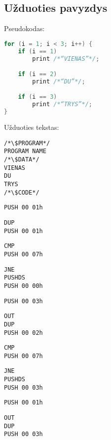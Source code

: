 \documentclass{scrartcl}
\begin{document}
        \subsection{Užduoties pavyzdys}
            Pseudokodas:
            \begin{lstlisting}[language = c]
for (i = 1; i < 3; i++) {
    if (i == 1)
        print /*“VIENAS”*/;

    if (i == 2)
        print /*“DU”*/;

    if (i == 3)
        print /*“TRYS”*/;
}
            \end{lstlisting}
            Užduoties tekstas:
            \lstset{belowskip = 0.0mm, numbers = none}
            \begin{lstlisting}
/*\$PROGRAM*/
PROGRAM NAME
/*\$DATA*/
VIENAS
DU
TRYS
/*\$CODE*/
            \end{lstlisting}
            \lstset{aboveskip = 0.0mm, belowskip = 0.0mm, numbers = left}
            \begin{lstlisting}[firstnumber = 0]
PUSH 00 01h
            \end{lstlisting}
            \begin{lstlisting}[firstnumber = 3]
DUP
PUSH 00 01h
            \end{lstlisting}
            \begin{lstlisting}[firstnumber = 7]
CMP
PUSH 00 07h
            \end{lstlisting}
            \begin{lstlisting}[firstnumber = 11]
JNE
PUSHDS
PUSH 00 00h
            \end{lstlisting}
            \begin{lstlisting}[firstnumber = 16]
PUSH 00 03h
            \end{lstlisting}
            \begin{lstlisting}[firstnumber = 19]
OUT
DUP
PUSH 00 02h
            \end{lstlisting}
            \begin{lstlisting}[firstnumber = 24]
CMP
PUSH 00 07h
            \end{lstlisting}
            \begin{lstlisting}[firstnumber = 28]
JNE
PUSHDS
PUSH 00 03h
            \end{lstlisting}
            \begin{lstlisting}[firstnumber = 33]
PUSH 00 01h
            \end{lstlisting}
            \begin{lstlisting}[firstnumber = 36]
OUT
DUP
PUSH 00 03h
            \end{lstlisting}
\end{document}
